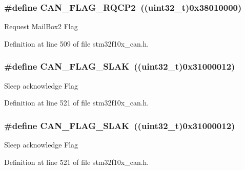 \subsubsection[{\texorpdfstring{C\+A\+N\+\_\+\+F\+L\+A\+G\+\_\+\+R\+Q\+C\+P2}{CAN_FLAG_RQCP2}}]{\setlength{\rightskip}{0pt plus 5cm}\#define C\+A\+N\+\_\+\+F\+L\+A\+G\+\_\+\+R\+Q\+C\+P2~(({\bf uint32\+\_\+t})0x38010000)}\hypertarget{group___c_a_n__flags_ga9c20cd47e558135bd7ae71149583d487}{}\label{group___c_a_n__flags_ga9c20cd47e558135bd7ae71149583d487}
Request Mail\+Box2 Flag 

Definition at line 509 of file stm32f10x\+\_\+can.\+h.

\subsubsection[{\texorpdfstring{C\+A\+N\+\_\+\+F\+L\+A\+G\+\_\+\+S\+L\+AK}{CAN_FLAG_SLAK}}]{\setlength{\rightskip}{0pt plus 5cm}\#define C\+A\+N\+\_\+\+F\+L\+A\+G\+\_\+\+S\+L\+AK~(({\bf uint32\+\_\+t})0x31000012)}\hypertarget{group___c_a_n__flags_gad087b5025a3d5ead2c32b06663821cf4}{}\label{group___c_a_n__flags_gad087b5025a3d5ead2c32b06663821cf4}
Sleep acknowledge Flag 

Definition at line 521 of file stm32f10x\+\_\+can.\+h.

\subsubsection[{\texorpdfstring{C\+A\+N\+\_\+\+F\+L\+A\+G\+\_\+\+S\+L\+AK}{CAN_FLAG_SLAK}}]{\setlength{\rightskip}{0pt plus 5cm}\#define C\+A\+N\+\_\+\+F\+L\+A\+G\+\_\+\+S\+L\+AK~(({\bf uint32\+\_\+t})0x31000012)}\hypertarget{group___c_a_n__flags_gad087b5025a3d5ead2c32b06663821cf4}{}\label{group___c_a_n__flags_gad087b5025a3d5ead2c32b06663821cf4}
Sleep acknowledge Flag 

Definition at line 521 of file stm32f10x\+\_\+can.\+h.

